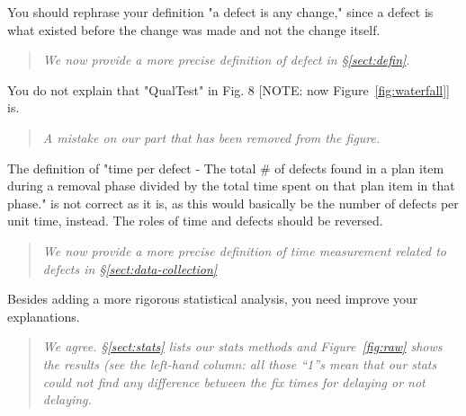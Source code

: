 \documentclass[smallcondensed]{svjour3}
\newcommand{\tion}[1]{\S\ref{sect:#1}}
\newcommand{\fig}[1]{Figure~\ref{fig:#1}}
\begin{document}
You should rephrase your definition "a defect is any change," since a defect is what existed before the change was made and not the change itself.
\begin{quote}
{\em We now provide a more precise definition of defect in \tion{defin}.
}
\end{quote} 
You do not explain that "QualTest" in Fig. 8 [NOTE: now \fig{waterfall}] is.
\begin{quote}
{\em A mistake on our part that has been removed from the figure.}
\end{quote}
The definition of "time per defect - The total \# of defects found in a plan item during a removal phase divided by the total time spent on that plan item in that phase." is not correct as it is, as this would basically be the number of defects per unit time, instead. The roles of time and
defects should be reversed.
\begin{quote}{\em We now provide a more precise definition of time measurement related to defects in \tion{data-collection}}\end{quote}

  

Besides adding a more rigorous statistical analysis, you
need improve your explanations.
\begin{quote}{\em We agree. \tion{stats} lists our stats methods and \fig{raw}
shows the results (see the left-hand column: all those ``1''s mean
that our stats could not find any difference between the fix times for
delaying or not delaying.}\end{quote}
\end{document}
